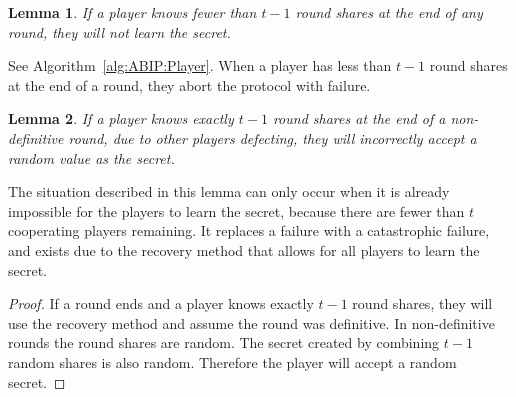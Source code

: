 \documentclass[12pt]{dalcsthesis}
\newtheorem{lemma}{Lemma}
\begin{document}
\begin{lemma}\label{Lem:ABIP:FewSharesNolearn}If a player knows fewer than $t-1$ round shares at the end of any round, they will not learn the secret.\end{lemma}

See Algorithm~\ref{alg:ABIP:Player}. When a player has less than $t-1$ round shares at the end of a round, they abort the protocol with failure.

\begin{lemma}\label{Lem:ABIP:MissDefSharesLearnWrong}If a player knows exactly $t-1$ round shares at the end of a non-definitive round, due to other players defecting, they will incorrectly accept a random value as the secret.\end{lemma}

The situation described in this lemma can only occur when it is already impossible for the players to learn the secret, because there are fewer than $t$ cooperating players remaining. It replaces a failure with a catastrophic failure, and exists due to the recovery method that allows for all players to learn the secret.
 
\begin{proof}
If a round ends and a player knows exactly $t-1$ round shares, they will use the recovery method and assume the round was definitive. In non-definitive rounds the round shares are random. The secret created by combining $t-1$ random shares is also random. Therefore the player will accept a random secret.
\end{proof}
\end{document}
